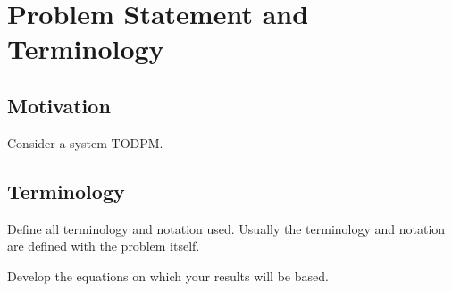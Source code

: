 \section{Problem Statement and Terminology}\label{sec:problem}
%


\subsection{Motivation}
Consider a system \ac{TODPM}\cite{rfc5841}.

\subsection{Terminology}
Define all terminology and notation used. Usually the terminology and notation
are defined with the problem itself.


Develop the equations on which your results will be based.

